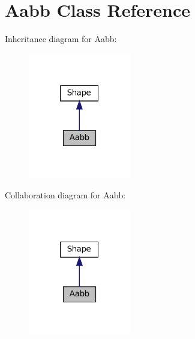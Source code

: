 \hypertarget{classAabb}{}\section{Aabb Class Reference}
\label{classAabb}


Inheritance diagram for Aabb\+:\nopagebreak
\begin{figure}[H]
\begin{center}
\leavevmode
\includegraphics[width=127pt]{classAabb__inherit__graph}
\end{center}
\end{figure}


Collaboration diagram for Aabb\+:\nopagebreak
\begin{figure}[H]
\begin{center}
\leavevmode
\includegraphics[width=127pt]{classAabb__coll__graph}
\end{center}
\end{figure}
